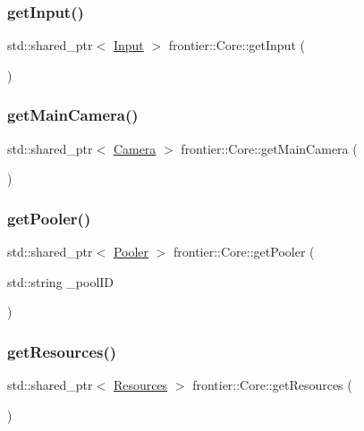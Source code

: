 \subsubsection{\texorpdfstring{get\+Input()}{getInput()}}
{\footnotesize\ttfamily std\+::shared\+\_\+ptr$<$ \hyperlink{classfrontier_1_1_input}{Input} $>$ frontier\+::\+Core\+::get\+Input (\begin{DoxyParamCaption}{ }\end{DoxyParamCaption})}

\mbox{\label{classfrontier_1_1_core_aaac15b0d42e84ab56a18058721b275de}} 
\subsubsection{\texorpdfstring{get\+Main\+Camera()}{getMainCamera()}}
{\footnotesize\ttfamily std\+::shared\+\_\+ptr$<$ \hyperlink{classfrontier_1_1_camera}{Camera} $>$ frontier\+::\+Core\+::get\+Main\+Camera (\begin{DoxyParamCaption}{ }\end{DoxyParamCaption})}

\mbox{\label{classfrontier_1_1_core_a25d135e58034991db392afbb585c46e3}} 
\subsubsection{\texorpdfstring{get\+Pooler()}{getPooler()}}
{\footnotesize\ttfamily std\+::shared\+\_\+ptr$<$ \hyperlink{classfrontier_1_1_pooler}{Pooler} $>$ frontier\+::\+Core\+::get\+Pooler (\begin{DoxyParamCaption}\item[{std\+::string}]{\+\_\+pool\+ID }\end{DoxyParamCaption})}

\mbox{\label{classfrontier_1_1_core_ac001bac9de75ba256fd3ce3251c6d624}} 
\subsubsection{\texorpdfstring{get\+Resources()}{getResources()}}
{\footnotesize\ttfamily std\+::shared\+\_\+ptr$<$ \hyperlink{classfrontier_1_1_resources}{Resources} $>$ frontier\+::\+Core\+::get\+Resources (\begin{DoxyParamCaption}{ }\end{DoxyParamCaption})}

